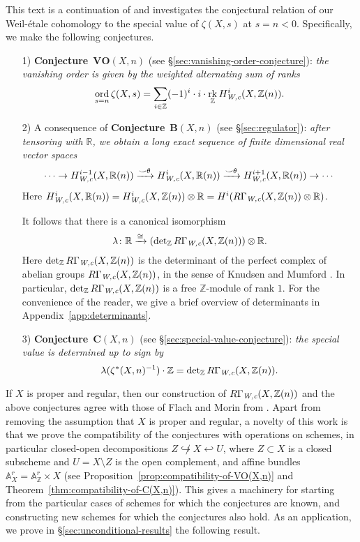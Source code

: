 \documentclass[10pt,a4paper,oneside,draft]{article}
\DeclareMathOperator{\ord}{ord}
\DeclareMathOperator{\rk}{rk}
\newcommand{\RR}{\mathbb{R}}
\newcommand{\ZZ}{\mathbb{Z}}
\renewcommand{\AA}{\mathbb{A}}
\renewcommand{\det}{\operatorname{det}}
\newcommand{\Wc}{\text{\it W,c}}
\theoremstyle{myplain}
\theoremstyle{mydefinition}
\numberwithin{equation}{section}
\begin{document}
This text is a continuation of \cite{Beshenov-Weil-etale-1} and investigates the
conjectural relation of our Weil-\'{e}tale cohomology to the special value of
$\zeta (X,s)$ at $s = n < 0$.  Specifically, we make the following conjectures.

\begin{enumerate}
\item[1)] \textbf{Conjecture}~$\mathbf{VO} (X,n)$
  (see \S\ref{sec:vanishing-order-conjecture}):
  \emph{the vanishing order is given by the weighted alternating sum of ranks}
  \[ \ord_{s=n} \zeta (X,s) =
    \sum_{i\in \ZZ} (-1)^i \cdot i \cdot \rk_\ZZ H_\Wc^i (X, \ZZ(n)). \]

\item[2)] A consequence of \textbf{Conjecture}~$\mathbf{B} (X,n)$
  (see \S\ref{sec:regulator}):
  \emph{after tensoring with $\RR$, we obtain a long exact sequence of finite
    dimensional real vector spaces}
  \[ \cdots \to H_\Wc^{i-1} (X, \RR (n)) \xrightarrow{\smile\theta}
    H_\Wc^i (X, \RR (n)) \xrightarrow{\smile\theta}
    H_\Wc^{i+1} (X, \RR (n)) \to \cdots \]
  Here
  $H_\Wc^i (X, \RR (n)) = H_\Wc^i (X, \ZZ (n)) \otimes \RR =
  H^i (R\Gamma_\Wc (X, \ZZ (n)) \otimes \RR)$.

  It follows that there is a canonical isomorphism
  \[ \lambda\colon \RR \xrightarrow{\cong}
    (\det_\ZZ R\Gamma_\Wc (X, \ZZ (n))) \otimes \RR. \]
  Here $\det_\ZZ R\Gamma_\Wc (X, \ZZ (n))$ is the determinant of the
  perfect complex of abelian groups $R\Gamma_\Wc (X, \ZZ (n))$, in the sense of
  Knudsen and Mumford \cite{Knudsen-Mumford-1976}. In particular,
  $\det_\ZZ R\Gamma_\Wc (X, \ZZ (n))$ is a free $\ZZ$-module of rank
  $1$. For the convenience of the reader, we give a brief overview of
  determinants in Appendix~\ref{app:determinants}.

\item[3)] \textbf{Conjecture}~$\mathbf{C} (X,n)$
  (see \S\ref{sec:special-value-conjecture}):
  \emph{the special value is determined up to sign by}
  \[ \lambda (\zeta^* (X, n)^{-1}) \cdot \ZZ =
    \det_\ZZ R\Gamma_\Wc (X, \ZZ (n)). \]
\end{enumerate}

If $X$ is proper and regular, then our construction of
$R\Gamma_\Wc (X, \ZZ (n))$ and the above conjectures agree with those of Flach
and Morin from \cite{Flach-Morin-2018}. Apart from removing the assumption that
$X$ is proper and regular, a novelty of this work is that we prove the
compatibility of the conjectures with operations on schemes, in particular
closed-open decompositions $Z \not\hookrightarrow X \hookleftarrow U$, where
$Z \subset X$ is a closed subscheme and $U = X\setminus Z$ is the open
complement, and affine bundles $\AA_X^r = \AA_\ZZ^r \times X$
(see Proposition~\ref{prop:compatibility-of-VO(X,n)} and
Theorem~\ref{thm:compatibility-of-C(X,n)}). This gives a machinery for starting
from the particular cases of schemes for which the conjectures are known, and
constructing new schemes for which the conjectures also hold.
As an application, we prove in \S\ref{sec:unconditional-results} the following
result.
\end{document}
